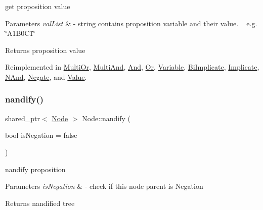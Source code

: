 get proposition value 


\begin{DoxyParams}{Parameters}
{\em val\+List} & -\/ string contains proposition variable and their value. ~\newline
 e.\+g. \char`\"{}\+A1\+B0\+C1\char`\"{} \\
\hline
\end{DoxyParams}
\begin{DoxyReturn}{Returns}
proposition value 
\end{DoxyReturn}


Reimplemented in \hyperlink{class_multi_or_a7146240d304444ee0da5c949c584971e}{Multi\+Or}, \hyperlink{class_multi_and_a7730036f89cf27cddcf6d2efc293dd9d}{Multi\+And}, \hyperlink{class_and_a9d2b965d8a1b80d0e2da9d6537601e14}{And}, \hyperlink{class_or_a9ede00ef8120ad4aee9f69049628ead9}{Or}, \hyperlink{class_variable_a2830553ab8b852a004c613a626fa6eb2}{Variable}, \hyperlink{class_bi_implicate_ac7cb17f1414705f9a1d9df83793b0d58}{Bi\+Implicate}, \hyperlink{class_implicate_a331e1a1fcbe378ef15a3a7f04b7034d5}{Implicate}, \hyperlink{class_n_and_a9eb3a117e8d30f11ebe25e932d387265}{N\+And}, \hyperlink{class_negate_adc2bf29215e329e60e44dbf6bf8a4c85}{Negate}, and \hyperlink{class_value_ac956d02a49c773f5249cc31fb4293337}{Value}.

\mbox{\label{class_node_a3b2e192b59b7e72908af7903c5a4e5c1}} 
\subsubsection{\texorpdfstring{nandify()}{nandify()}}
{\footnotesize\ttfamily shared\+\_\+ptr$<$ \hyperlink{class_node}{Node} $>$ Node\+::nandify (\begin{DoxyParamCaption}\item[{bool}]{is\+Negation = {\ttfamily false} }\end{DoxyParamCaption})\hspace{0.3cm}{\ttfamily [virtual]}}



nandify proposition 


\begin{DoxyParams}{Parameters}
{\em is\+Negation} & -\/ check if this node parent is Negation \\
\hline
\end{DoxyParams}
\begin{DoxyReturn}{Returns}
nandified tree 
\end{DoxyReturn}


